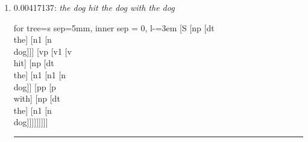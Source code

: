 \documentclass[11pt]{article}
\begin{document}
\begin{enumerate}
	\item  0.00417137: \textit{the dog hit the dog with the dog} \\[0.5em]
	\begin{forest}
	for tree={s sep=5mm, inner sep = 0, l-=3em}
	[S [np [dt\\the] [n1 [n\\dog]]] [vp [v1 [v\\hit] [np [dt\\the] [n1 [n1 [n\\dog]] [pp [p\\with] [np [dt\\the] [n1 [n\\dog]]]]]]]]]
	\end{forest}
	\vspace{2\baselineskip}
	\hrule

\end{enumerate}
\end{document}
